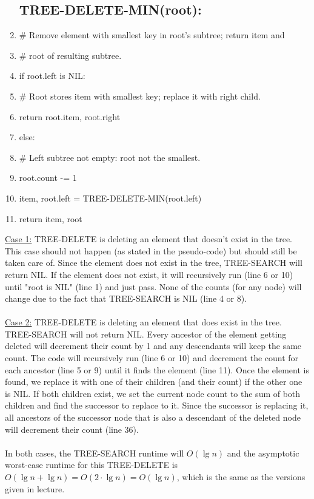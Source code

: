 \documentclass{article}
\begin{document}
\begin{enumerate}[itemsep=0pt,parsep=0pt]
\subsection*{TREE-DELETE-MIN(root):}
    \item \# Remove element with smallest key in root's subtree; return item and
    \item \# root of resulting subtree.
    \item if root.left is NIL:
    \item \qquad \# Root stores item with smallest key; replace it with right child. 
    \item \qquad return root.item, root.right
    \item else:
    \item \qquad \# Left subtree not empty: root not the smallest.
    \item \qquad root.count -= 1
    \item \qquad item, root.left = TREE-DELETE-MIN(root.left)
    \item \qquad return item, root
\end{enumerate}
\underline{Case 1:} TREE-DELETE is deleting an element that doesn't exist in the tree. This case should not happen (as stated in the pseudo-code) but should still be taken care of. Since the element does not exist in the tree, TREE-SEARCH will return NIL. If the element does not exist, it will recursively run (line 6 or 10) until "root is NIL" (line 1) and just pass. None of the counts (for any node) will change due to the fact that TREE-SEARCH is NIL (line 4 or 8).\\~\\
\underline{Case 2:} TREE-DELETE is deleting an element that does exist in the tree. TREE-SEARCH will not return NIL. Every ancestor of the element getting deleted will decrement their count by 1 and any descendants will keep the same count. The code will recursively run (line 6 or 10) and decrement the count for each ancestor (line 5 or 9) until it finds the element (line 11). Once the element is found, we replace it with one of their children (and their count) if the other one is NIL. If both children exist, we set the current node count to the sum of both children and find the successor to replace to it. Since the successor is replacing it, all ancestors of the successor node that is also a descendant of the deleted node will decrement their count (line 36).\\~\\
In both cases, the TREE-SEARCH runtime will $O(\lg n)$ and the asymptotic worst-case runtime for this TREE-DELETE is $O(\lg n+\lg n) = O(2\cdot\lg n) = O(\lg n)$, which is the same as the versions given in lecture.
\end{document}
